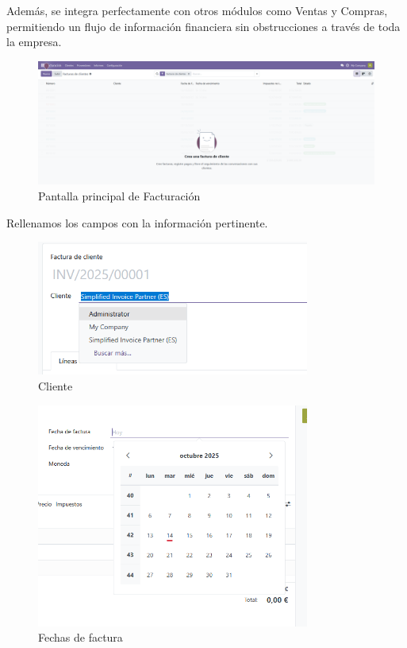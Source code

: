 \documentclass[a4paper,12pt]{article}
\begin{document}
Además, se integra perfectamente con otros módulos como Ventas y Compras, permitiendo un flujo de información financiera sin obstrucciones a través de toda la empresa.

\begin{figure}[h!]
    \centering
    \includegraphics[width=1\textwidth]{pr2odoo02-facturacMain.png}
    \caption{Pantalla principal de Facturación}
\end{figure}
\FloatBarrier

\clearpage

Rellenamos los campos con la información pertinente.

\begin{figure}[h!]
    \centering
    \includegraphics[width=0.8\textwidth]{pr2odoo03-facturac01.png}
    \caption{Cliente}
\end{figure}
\FloatBarrier

\begin{figure}[h!]
    \centering
    \includegraphics[width=0.8\textwidth]{pr2odoo04-facturac02.png}
    \caption{Fechas de factura}
\end{figure}
\FloatBarrier
\end{document}
